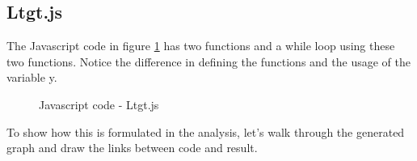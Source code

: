 \documentclass[a4paper,10pt]{article}
\begin{document}
 
 \subsection{Ltgt.js}
 The Javascript code in figure \ref{ltgtCode} has two functions and a while loop using these two functions.
 Notice the difference in defining the functions and the usage of the variable y.
 
 \begin{figure}
  
 \caption{Javascript code - Ltgt.js}
 \label{ltgtCode}
 \end{figure}
 
 To show how this is formulated in the analysis, let's walk through the generated graph and draw the links between code and result.
 
 \begin{figure}
 	\begin{center}

\end{center}
\end{figure}
\end{document}
